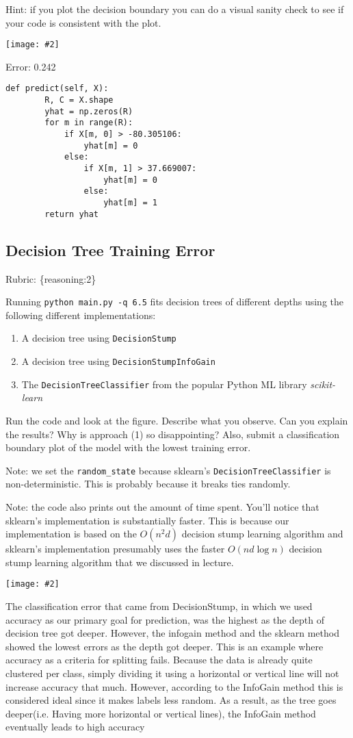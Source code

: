 \documentclass{article}
\def\rubric#1{\gre{Rubric: \{#1\}}}{}
\def\blu#1{{\color{blu}#1}}
\def\gre#1{{\color{gre}#1}}
\def\red#1{{\color{red}#1}}
\newcommand{\centerfig}[2]{\begin{center}\texttt{[image: \#2]}\end{center}}
\def\enum#1{\begin{enumerate}#1\end{enumerate}}
\begin{document}
Hint: if you plot the decision boundary you can do a visual sanity check to see if your code is consistent with the plot.

\centerfig{0.7}{./figs/q6_4_decisionBoundary}
\red{Error: 0.242}

\begin{lstlisting}
def predict(self, X):
        R, C = X.shape
        yhat = np.zeros(R)
        for m in range(R):
            if X[m, 0] > -80.305106:
                yhat[m] = 0
            else:
                if X[m, 1] > 37.669007:
                    yhat[m] = 0
                else:
                    yhat[m] = 1
        return yhat
\end{lstlisting}

\subsection{Decision Tree Training Error}
\rubric{reasoning:2}

Running \texttt{python main.py -q 6.5} fits decision trees of different depths using the following different implementations: 
\enum{
\item A decision tree using \texttt{DecisionStump}
\item A decision tree using \texttt{DecisionStumpInfoGain}
\item The \texttt{DecisionTreeClassifier} from the popular Python ML library \emph{scikit-learn}
}

Run the code and look at the figure.
\blu{Describe what you observe. Can you explain the results?} Why is approach (1) so disappointing? Also, \blu{submit a classification boundary plot of the model with the lowest training error}.

Note: we set the \verb|random_state| because sklearn's \texttt{DecisionTreeClassifier} is non-deterministic. This is probably
because it breaks ties randomly.

Note: the code also prints out the amount of time spent. You'll notice that sklearn's implementation is substantially faster. This is because
our implementation is based on the $O(n^2d)$ decision stump learning algorithm and sklearn's implementation presumably uses the faster $O(nd\log n)$
decision stump learning algorithm that we discussed in lecture.

\centerfig{0.7}{./figs/q6_5_tree_errors}

\red{The classification error that came from DecisionStump, in which we used accuracy as our primary goal for prediction, was the highest as the depth of decision tree got deeper. However, the infogain method and the sklearn method showed the lowest errors as the depth got deeper. This is an example where accuracy as a criteria for splitting fails. Because the data is already quite clustered per class, simply dividing it using a horizontal or vertical line will not increase accuracy that much. However, according to the InfoGain method this is considered ideal since it makes labels less random. As a result, as the tree goes deeper(i.e. Having more horizontal or vertical lines), the InfoGain method eventually leads to high accuracy}
\end{document}
